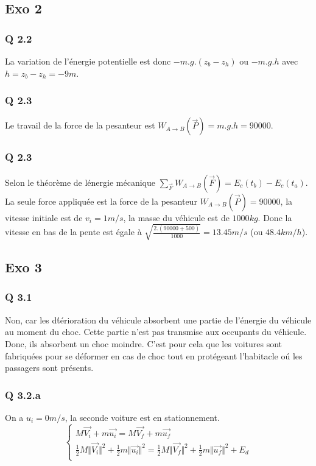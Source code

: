 \documentclass[]{book}
\theoremstyle{definition}
\begin{document}
\subsection*{Exo 2}
\subsubsection*{Q 2.2}
La variation de l'\'energie potentielle est donc $-m.g.(z_b - z_h)$ ou $-m.g.h$ avec $h = z_b - z_h = -9m$.

\subsubsection*{Q 2.3}
Le travail de la force de la pesanteur est $W_{A \to B}(\overrightarrow{P})= m.g.h = 90000$.

\subsubsection*{Q 2.3}
Selon le th\'eor\`eme de l\'energie m\'ecanique $\sum_{\overrightarrow{F}}W_{A \to B}(\overrightarrow{F}) = E_c(t_b) - E_c(t_a)$.
La seule force appliqu\'ee est la force de la pesanteur $W_{A \to B}(\overrightarrow{P})= 90000$, la vitesse initiale est de $v_i = 1m/s$, la masse du v\'ehicule est de $1000kg$. Donc la vitesse en bas de la pente est \'egale \`a $\sqrt{\frac{2.(90000+500)}{1000}} = 13.45m/s$ (ou $48.4km/h$).

\subsection*{Exo 3}
\subsubsection*{Q 3.1}
Non, car les d\'t\'erioration du v\'ehicule absorbent une partie de l'\'energie du v\'ehicule au moment du choc. Cette partie n'est pas transmise aux occupants du v\'ehicule. Donc, ils absorbent un choc moindre. C'est pour cela que les voitures sont fabriqu\'ees pour se d\'eformer en cas de choc tout en prot\'egeant l'habitacle o\'u les passagers sont pr\'esents.

\subsubsection*{Q 3.2.a}
On a $u_i = 0m/s$, la seconde voiture est en stationnement.
$$
\left\{ 
\begin{array}{l}
 M\overrightarrow{V_i} + m\overrightarrow{u_i} = M\overrightarrow{V_f} + m\overrightarrow{u_f} \\
 \frac{1}{2}M\Vert \overrightarrow{V_i} \Vert^2 + \frac{1}{2}m\Vert \overrightarrow{u_i} \Vert^2 = \frac{1}{2}M\Vert \overrightarrow{V_f} \Vert^2 + \frac{1}{2}m\Vert \overrightarrow{u_f} \Vert^2 + E_d\\
\end{array}
\right. 
$$
\end{document}
